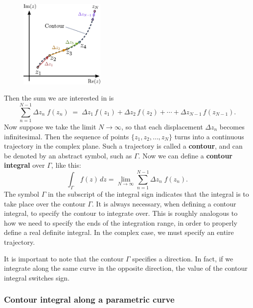 \documentclass[10pt,a4paper]{article}
\begin{document}
\begin{figure}[h]
  \centering\includegraphics[width=0.37\textwidth]{complex_integral}
\end{figure}

Then the sum we are interested in is
\begin{equation}
\sum_{n=1}^{N-1} \Delta z_n\; f(z_n) \;=\; \Delta z_1\, f(z_1) + \Delta z_2\, f(z_2) + \cdots + \Delta z_{N-1}\, f(z_{N-1}).
\end{equation}
Now suppose we take the limit $N \rightarrow \infty$, so that each
displacement $\Delta z_{n}$ becomes infinitesimal. Then the sequence
of points $\{z_1, z_2, \dots, z_N\}$ turns into a continuous
trajectory in the complex plane. Such a trajectory is called a
\textbf{contour}, and can be denoted by an abstract symbol, such as
$\Gamma$. Now we can define a \textbf{contour integral} over
$\Gamma$, like this:
\begin{equation}
\int_\Gamma \, f(z)\, dz = \lim_{N \rightarrow \infty} \sum_{n=1}^{N-1} \Delta z_n\; f(z_n).
\end{equation}
The symbol $\Gamma$ in the subscript of the integral sign indicates
that the integral is to take place over the contour $\Gamma$. It is
always necessary, when defining a contour integral, to specify the
contour to integrate over. This is roughly analogous to how we need to
specify the ends of the integration range, in order to properly define
a real definite integral. In the complex case, we must specify an
entire trajectory.

It is important to note that the contour $\Gamma$ specifies a
direction. In fact, if we integrate along the same curve in the opposite
direction, the value of the contour integral switches sign.

\subsubsection{Contour integral along a parametric curve}
\label{contour-integral-along-a-parametric-curve}
\end{document}
